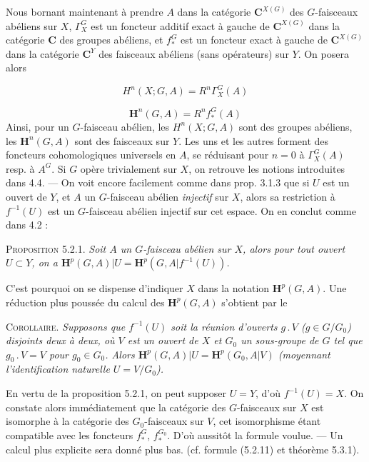 \clearpage
{}

Nous bornant maintenant à prendre $A$ dans la catégorie ${\mathbf C}^{X(G)}$ des
$G$-faisceaux abéliens sur $X$, $\Gamma_X^G$ est un foncteur additif exact à
gauche de ${\mathbf C}^{X(G)}$ dans la catégorie ${\mathbf C}$ des groupes abéliens, et $f_*^G$
est un foncteur exact à gauche de ${\mathbf C}^{X(G)}$ dans la catégorie ${\mathbf C}^Y$ des
faisceaux abéliens (sans opérateurs) sur $Y$. On posera alors

\[
H^n(X;G,A)=R^n\Gamma_X^G(A)
\tag{5.2.3}
\]

\[
\mathbf H^n(G,A)=R^nf_*^G(A)
\tag{5.2.4}
\]
Ainsi, pour un $G$-faisceau abélien, les $H^n(X;G,A)$ sont des groupes
abéliens, les $\mathbf H^n(G,A)$ sont des faisceaux sur $Y$. Les uns et les
autres forment des foncteurs cohomologiques universels en $A$, se réduisant
pour $n=0$ à $\Gamma_X^G(A)$ resp. à $A^G$. Si $G$ opère trivialement sur
$X$, on retrouve les notions introduites dans 4.4. --- On voit encore
facilement comme dans prop. 3.1.3 que si $U$ est un ouvert de $Y$, et $A$ un
$G$-faisceau abélien \textit{injectif} sur $X$, alors sa restriction à $f^{-1}(U)$ est
un $G$-faisceau abélien injectif sur cet espace. On en conclut comme dans
4.2 :

\textsc{Proposition 5.2.1.} \textit{Soit $A$ un $G$-faisceau abélien
sur $X$, alors pour tout ouvert $U\subset Y$, on a
$\mathbf H^p(G,A)\vert U=\mathbf H^p(G,A\vert f^{-1}(U))$.}

C'est pourquoi on se dispense d'indiquer $X$ dans la notation
$\mathbf H^p(G,A)$. Une réduction plus poussée du calcul des
$\mathbf H^p(G,A)$ s'obtient par le

\textsc{Corollaire.} \textit{Supposons que $f^{-1}(U)$ soit la
réunion d'ouverts $g\mathbin{.}V$ ($g\in G/G_0$) disjoints deux à deux,
où $V$ est un ouvert de $X$ et $G_0$ un sous-groupe de $G$ tel que
$g_0\mathbin{.}V=V$ pour $g_0\in G_0$. Alors
$\mathbf H^p(G,A)\vert U=\mathbf H^p(G_0,A\vert V)$ (moyennant
l'identification naturelle $U=V/G_0$).}

En vertu de la proposition 5.2.1, on peut supposer $U=Y$, d'où
$f^{-1}(U)=X$. On constate alors immédiatement que la catégorie des
$G$-faisceaux sur $X$ est isomorphe à la catégorie des $G_0$-faisceaux sur
$V$, cet isomorphisme étant compatible avec les foncteurs $f_*^G$,
$f_*^{G_0}$. D'où aussitôt la formule voulue. --- Un calcul plus explicite
sera donné plus bas. (cf. formule (5.2.11) et théorème 5.3.1).

